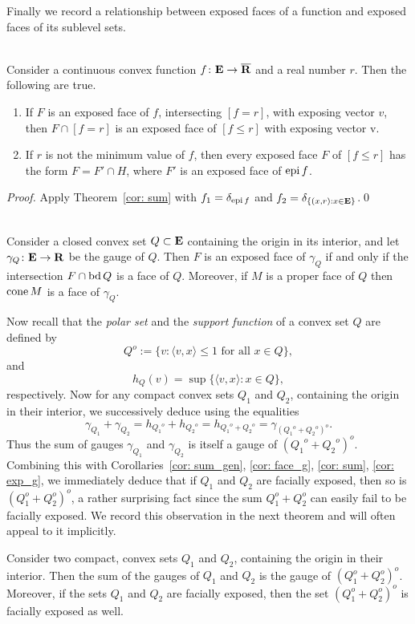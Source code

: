 \documentclass[smallextended,numbook]{svjour3}
\begin{document}
Finally we record a relationship between exposed faces of a function and exposed faces of its sublevel sets.
\begin{cor}\label{cor:sub_exp} \hfill \\
Consider a continuous convex function $f\colon{{\bf E}}\to\overline{{\bf R}}$ and a real number $r$. Then the following are true.
\begin{enumerate}
\item If $F$ is an exposed face of $f$, intersecting $[f=r]$, with exposing vector $v$, then $F\cap [f=r]$ is an exposed face of $[f\leq r]$ with exposing vector v.
\item If $r$ is not the minimum value of $f$, then every exposed face $F$ of $[f\leq r]$ has the form $F=F'\cap H$, where  $F'$ is an exposed face of ${\mbox{\rm epi}\,} f$. 
\end{enumerate}
\end{cor}
\begin{proof}
Apply Theorem~\ref{cor: sum} with $f_1=\delta_{{\mbox{\rm {\scriptsize epi}}\,} f}$ and $f_2=\delta_{\{(x,r): x\in{{\bf E}}\}}$.\qed
\end{proof}

\begin{cor}\label{cor: exp_g}\hfill \\
Consider a closed convex set $Q\subset{{\bf E}}$ containing the origin in its interior, and let $\gamma_Q\colon{{\bf E}}\to{{\bf R}}$ be the gauge of $Q$. Then $F$ is an exposed face of $\gamma_Q$ if and only if the intersection $F\cap{\mbox{\rm bd}\,} Q$ is a face of $Q$. Moreover, if $M$ is a proper face of $Q$ then ${\mbox{\rm cone}\,} M$ is a face of $\gamma_Q$.
\end{cor}

Now recall that the {\em polar set} and the {\em support function} of a convex set $Q$ are defined by 
$$Q^{o}:=\{v: \langle v,x\rangle \leq 1 \textrm{ for all } x\in Q\},$$
and 
$$h_Q(v)=\sup\{\langle v,x\rangle: x\in Q\},$$
respectively. Now for any compact convex sets $Q_1$ and $Q_2$, containing the origin in their interior, we successively deduce using \cite[Theorem~14.5]{conv_an} the equalities
$$\gamma_{{Q_1}}+\gamma_{{Q_2}}=h_{{Q_1}^{o}}+h_{{Q_2}^{o}}=h_{{Q_1}^{o}+{Q_2}^{o}}=\gamma_{({Q_1}^{o}+{Q_2}^o)^{o}}.$$ 
Thus the sum of gauges $\gamma_{{Q_1}}$ and $\gamma_{{Q_2}}$ is itself a gauge of $({Q_1}^{o}+{Q_2}^o)^{o}$. Combining this with Corollaries~\ref{cor: sum_gen}, \ref{cor: face_g}, \ref{cor: sum}, \ref{cor: exp_g}, we immediately deduce that if $Q_1$ and $Q_2$ are facially exposed, then so is  $(Q^o_1+Q^o_2)^o$, a rather surprising fact since the sum $Q^o_1+Q^o_2$ can easily fail to be facially exposed. We record this observation in the next theorem and will often appeal to it implicitly.
\begin{cor}\label{cor:face_exp} 
Consider two compact, convex sets $Q_1$ and $Q_2$, containing the origin in their interior. Then the sum of the gauges of $Q_1$ and $Q_2$ is the gauge of $(Q^o_1+Q^o_2)^o$. Moreover, if the sets $Q_1$ and $Q_2$ are facially exposed, then the set $(Q^o_1+Q^o_2)^o$ is facially exposed as well.
\end{cor}
\end{document}
